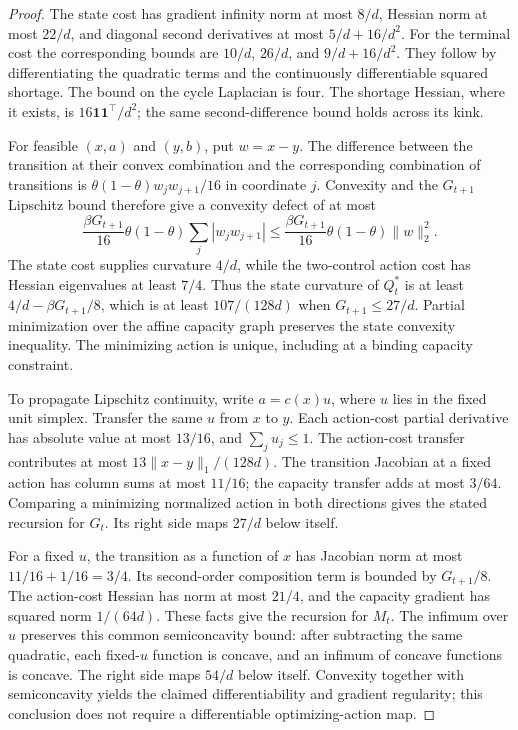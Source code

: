 \begin{proof}
The state cost has gradient infinity norm at most $8/d$, Hessian norm at most $22/d$, and diagonal second derivatives at most $5/d+16/d^2$. For the terminal cost the corresponding bounds are $10/d$, $26/d$, and $9/d+16/d^2$. They follow by differentiating the quadratic terms and the continuously differentiable squared shortage. The bound on the cycle Laplacian is four. The shortage Hessian, where it exists, is $16\mathbf1\mathbf1^\top/d^2$; the same second-difference bound holds across its kink.

For feasible $(x,a)$ and $(y,b)$, put $w=x-y$. The difference between the transition at their convex combination and the corresponding combination of transitions is $\theta(1-\theta)w_jw_{j+1}/16$ in coordinate $j$. Convexity and the $G_{t+1}$ Lipschitz bound therefore give a convexity defect of at most
\[
 \frac{\beta G_{t+1}}{16}\theta(1-\theta)
                 \sum_j|w_jw_{j+1}|
 \le\frac{\beta G_{t+1}}{16}\theta(1-\theta)\|w\|_2^2.
\]
The state cost supplies curvature $4/d$, while the two-control action cost has Hessian eigenvalues at least $7/4$. Thus the state curvature of $Q_t^*$ is at least $4/d-\beta G_{t+1}/8$, which is at least $107/(128d)$ when $G_{t+1}\le27/d$. Partial minimization over the affine capacity graph preserves the state convexity inequality. The minimizing action is unique, including at a binding capacity constraint.

To propagate Lipschitz continuity, write $a=c(x)u$, where $u$ lies in the fixed unit simplex. Transfer the same $u$ from $x$ to $y$. Each action-cost partial derivative has absolute value at most $13/16$, and $\sum_j u_j\le1$. The action-cost transfer contributes at most $13\|x-y\|_1/(128d)$. The transition Jacobian at a fixed action has column sums at most $11/16$; the capacity transfer adds at most $3/64$. Comparing a minimizing normalized action in both directions gives the stated recursion for $G_t$. Its right side maps $27/d$ below itself.

For a fixed $u$, the transition as a function of $x$ has Jacobian norm at most $11/16+1/16=3/4$. Its second-order composition term is bounded by $G_{t+1}/8$. The action-cost Hessian has norm at most $21/4$, and the capacity gradient has squared norm $1/(64d)$. These facts give the recursion for $M_t$. The infimum over $u$ preserves this common semiconcavity bound: after subtracting the same quadratic, each fixed-$u$ function is concave, and an infimum of concave functions is concave. The right side maps $54/d$ below itself. Convexity together with semiconcavity yields the claimed differentiability and gradient regularity; this conclusion does not require a differentiable optimizing-action map.


\end{proof}
